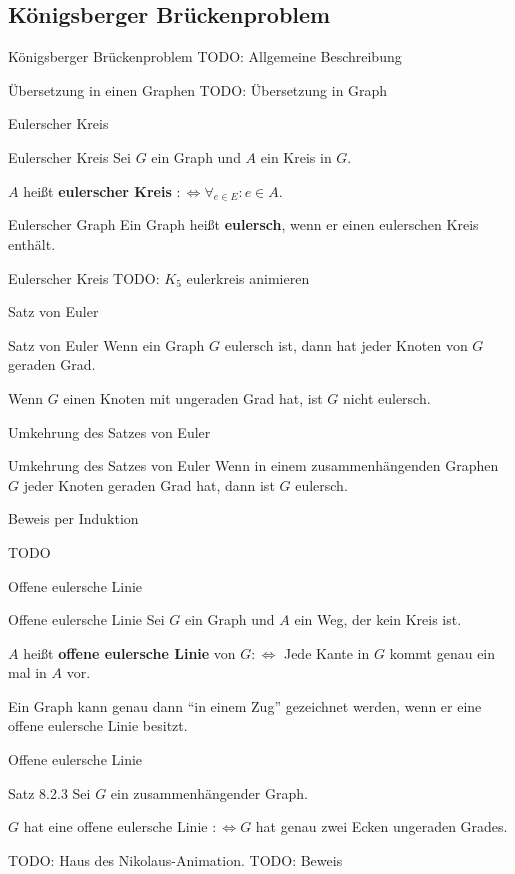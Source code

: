 \subsection{Königsberger Brückenproblem}
\begin{frame}{Königsberger Brückenproblem}
TODO: Allgemeine Beschreibung
\end{frame}

\begin{frame}{Übersetzung in einen Graphen}
TODO: Übersetzung in Graph
\end{frame}

\begin{frame}{Eulerscher Kreis}
\begin{block}{Eulerscher Kreis}
Sei $G$ ein Graph und $A$ ein Kreis in $G$.

$A$ heißt \textbf{eulerscher Kreis} $:\Leftrightarrow \forall_{e \in E}: e \in A$.
\end{block}

\begin{block}{Eulerscher Graph}
Ein Graph heißt \textbf{eulersch}, wenn er einen eulerschen Kreis enthält.
\end{block}
\end{frame}

\begin{frame}{Eulerscher Kreis}
TODO: $K_5$ eulerkreis animieren
\end{frame}

\begin{frame}{Satz von Euler}
\begin{block}{Satz von Euler}
Wenn ein Graph $G$ eulersch ist, dann hat jeder Knoten von $G$ geraden Grad.
\end{block}

Wenn $G$ einen Knoten mit ungeraden Grad hat, ist $G$ nicht eulersch.
\end{frame}

\begin{frame}{Umkehrung des Satzes von Euler}
\begin{block}{Umkehrung des Satzes von Euler}
Wenn in einem zusammenhängenden Graphen $G$ jeder Knoten geraden Grad hat, dann 
ist $G$ eulersch.
\end{block}

Beweis per Induktion

TODO
\end{frame}

\begin{frame}{Offene eulersche Linie}
\begin{block}{Offene eulersche Linie}
Sei $G$ ein Graph und $A$ ein Weg, der kein Kreis ist.

$A$ heißt \textbf{offene eulersche Linie} von $G :\Leftrightarrow$ Jede Kante in $G$ kommt genau ein mal in $A$ vor.
\end{block}

Ein Graph kann genau dann "`in einem Zug"' gezeichnet werden, wenn er eine 
offene eulersche Linie besitzt.
\end{frame}

\begin{frame}{Offene eulersche Linie}
\begin{block}{Satz 8.2.3}
Sei $G$ ein zusammenhängender Graph.

$G$ hat eine offene eulersche Linie $:\Leftrightarrow G$ hat genau zwei Ecken 
ungeraden Grades.
\end{block}

TODO: Haus des Nikolaus-Animation.
TODO: Beweis
\end{frame}
